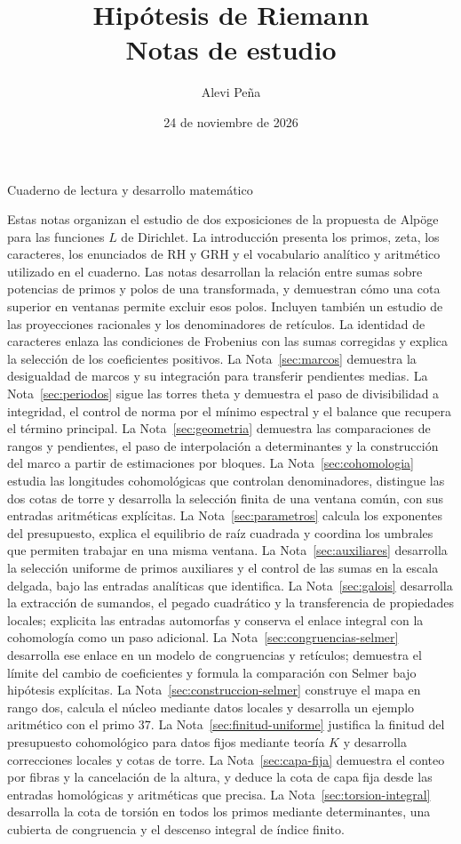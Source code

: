 \documentclass[11pt,a4paper]{article}
\title{\textbf{Hipótesis de Riemann}\\[0.35em]
  \Large Notas de estudio}
\author{Alevi Peña}
\date{24 de noviembre de 2026}
\begin{document}
\maketitle
\thispagestyle{empty}
\begin{center}
  \small Cuaderno de lectura y desarrollo matemático
\end{center}
\vspace{0.5em}
\noindent Estas notas organizan el estudio de dos exposiciones de la propuesta
de Alpöge para las funciones $L$ de Dirichlet. La introducción presenta
los primos, zeta, los caracteres, los enunciados de RH y GRH y el vocabulario
analítico y aritmético utilizado en el cuaderno. Las notas desarrollan la relación entre
sumas sobre potencias de primos y polos de una transformada, y demuestran
cómo una cota superior en ventanas permite excluir esos polos.
Incluyen también un estudio de las proyecciones racionales y los
denominadores de retículos. La identidad de caracteres enlaza las
condiciones de Frobenius con las sumas corregidas y explica la selección
de los coeficientes positivos. La Nota~\ref{sec:marcos} demuestra la
desigualdad de marcos y su integración para transferir pendientes medias.
La Nota~\ref{sec:periodos} sigue las torres theta y demuestra el paso de
divisibilidad a integridad, el control de norma por el mínimo espectral
y el balance que recupera el término principal.
La Nota~\ref{sec:geometria} demuestra las comparaciones de
rangos y pendientes, el paso de interpolación a determinantes
y la construcción del marco a partir de estimaciones por bloques.
La Nota~\ref{sec:cohomologia} estudia las longitudes cohomológicas
que controlan denominadores, distingue las dos cotas de torre
y desarrolla la selección finita de una ventana común,
con sus entradas aritméticas explícitas.
La Nota~\ref{sec:parametros} calcula los exponentes del presupuesto,
explica el equilibrio de raíz cuadrada y coordina los umbrales
que permiten trabajar en una misma ventana.
La Nota~\ref{sec:auxiliares} desarrolla la selección uniforme de
primos auxiliares y el control de las sumas en la escala delgada,
bajo las entradas analíticas que identifica.
La Nota~\ref{sec:galois} desarrolla la extracción de sumandos,
el pegado cuadrático y la transferencia de propiedades locales;
explicita las entradas automorfas y conserva el enlace integral
con la cohomología como un paso adicional.
La Nota~\ref{sec:congruencias-selmer} desarrolla ese enlace en un
modelo de congruencias y retículos; demuestra el límite del cambio
de coeficientes y formula la comparación con Selmer bajo hipótesis
explícitas. La Nota~\ref{sec:construccion-selmer} construye el mapa
en rango dos, calcula el núcleo mediante datos locales y desarrolla
un ejemplo aritmético con el primo $37$. La Nota~\ref{sec:finitud-uniforme}
justifica la finitud del presupuesto cohomológico para datos fijos
mediante teoría $K$ y desarrolla correcciones locales y cotas de torre.
La Nota~\ref{sec:capa-fija} demuestra el conteo por fibras y la
cancelación de la altura, y deduce la cota de capa fija desde
las entradas homológicas y aritméticas que precisa.
La Nota~\ref{sec:torsion-integral} desarrolla la cota de torsión
en todos los primos mediante determinantes, una cubierta de
congruencia y el descenso integral de índice finito.
\end{document}
